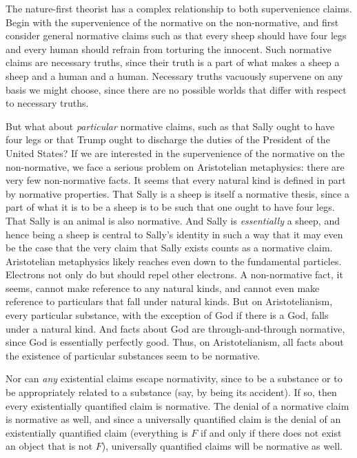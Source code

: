 The nature-first theorist has a complex relationship to both supervenience claims. Begin
with the supervenience of the normative on the non-normative, and first consider
general normative claims such as that every sheep should have four legs and every human should refrain
from torturing the innocent. Such normative claims are necessary truths, since their truth is a part of
what makes a sheep a sheep and a human and a human. Necessary truths vacuously supervene on any basis
we might choose, since there are no possible worlds that differ with respect to necessary truths.

But what about \textit{particular} normative claims, such as that Sally ought to have four legs
or that Trump ought to discharge the duties of the President of the United States? If we are
interested in the supervenience of the normative on the non-normative, we face a serious problem on
Aristotelian metaphysics: there are very few non-normative facts. It seems that every natural kind
is defined in part by normative properties. That Sally is a sheep is itself a normative thesis,
since a part of what it is to be a sheep is to be such that one ought to have four legs. That Sally
is an animal is also normative. And Sally is \textit{essentially} a sheep, and hence being a sheep
is central to Sally's identity in such a way that it may even be the case that the very claim that
Sally exists counts as a normative claim. Aristotelian metaphysics likely reaches even down to the fundamental
particles. Electrons not only do but should repel other electrons. 
A non-normative fact, it seems, cannot 
make reference to any natural kinds, and cannot even make reference to particulars that fall under natural
kinds. But on Aristotelianism, every particular substance, with the exception of God if there is a God, falls under a natural kind.
And facts about God are through-and-through normative, since God is essentially perfectly good. Thus,
on Aristotelianism, all facts about the existence of particular substances seem to be normative. 

Nor can \textit{any} existential claims escape normativity, since to be a substance or to be appropriately 
related to a substance (say, by being its accident).
If so, then every
existentially quantified claim is normative. The denial of a normative claim is normative as well, and
since a universally quantified claim is the denial of an existentially quantified claim (everything is
$F$ if and only if there does not exist an object that is not $F$), universally quantified claims 
will be normative as well. 

